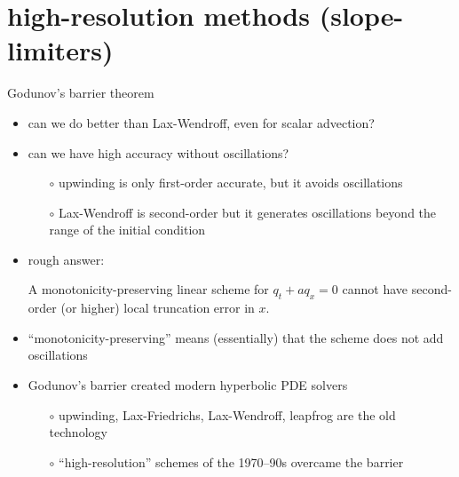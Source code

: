 \documentclass[10pt,dvipsnames,usepdftitle=false,
hyperref={pdftitle = {Finite volume methods},
    pdfauthor = {Ed Bueler}}]{beamer}
\begin{document}
\section{high-resolution methods (slope-limiters)}

\begin{frame}{Godunov's barrier theorem}

\begin{itemize}
\item can we do better than Lax-Wendroff, even for scalar advection?
\item can we have high accuracy without oscillations?
    \begin{itemize}
    \item[$\circ$] upwinding is only first-order accurate, but it avoids oscillations
    \item[$\circ$] Lax-Wendroff is second-order but it generates oscillations beyond the range of the initial condition
    \end{itemize}
\item rough answer: 

\medskip
\begin{theorem}  A monotonicity-preserving \alert<2>{linear} scheme for $q_t + a q_x=0$ cannot have second-order (or higher) local truncation error in $x$.\end{theorem}

\item ``monotonicity-preserving'' means (essentially) that the scheme does not add oscillations
\item Godunov's barrier created modern hyperbolic PDE solvers
    \begin{itemize}
    \item[$\circ$] upwinding, Lax-Friedrichs, Lax-Wendroff, leapfrog are the old technology
    \item[$\circ$] ``high-resolution'' schemes of the 1970--90s overcame the barrier 
    \end{itemize}
\end{itemize}
\end{frame}
\end{document}

